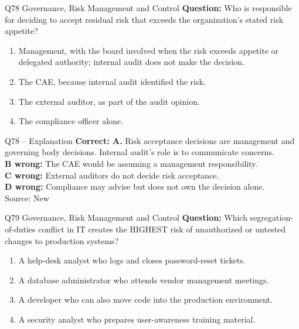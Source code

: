 \documentclass[aspectratio=169,10pt]{beamer}
\begin{document}
\begin{frame}[t]{Q78 \hfill {\scriptsize Governance, Risk Management and Control}}
	\small
	\textbf{Question:} Who is responsible for deciding to accept residual risk that exceeds the organization's stated risk appetite?
	\begin{enumerate}[label=\Alph*.,itemsep=1pt,topsep=3pt]
			\item Management, with the board involved when the risk exceeds appetite or delegated authority; internal audit does not make the decision.
			\item The CAE, because internal audit identified the risk.
			\item The external auditor, as part of the audit opinion.
			\item The compliance officer alone.
	\end{enumerate}
\end{frame}

\begin{frame}[t]{Q78 -- Explanation}
	\footnotesize
	\textbf{Correct: A.} Risk acceptance decisions are management and governing body decisions. Internal audit's role is to communicate concerns. \\[5pt]
\textbf{B wrong:} The CAE would be assuming a management responsibility. \\[3pt]
\textbf{C wrong:} External auditors do not decide risk acceptance. \\[3pt]
\textbf{D wrong:} Compliance may advise but does not own the decision alone. \\[3pt]
	\vfill {\tiny Source: New}
\end{frame}

\begin{frame}[t]{Q79 \hfill {\scriptsize Governance, Risk Management and Control}}
	\small
	\textbf{Question:} Which segregation-of-duties conflict in IT creates the HIGHEST risk of unauthorized or untested changes to production systems?
	\begin{enumerate}[label=\Alph*.,itemsep=1pt,topsep=3pt]
			\item A help-desk analyst who logs and closes password-reset tickets.
			\item A database administrator who attends vendor management meetings.
			\item A developer who can also move code into the production environment.
			\item A security analyst who prepares user-awareness training material.
	\end{enumerate}
\end{frame}
\end{document}
